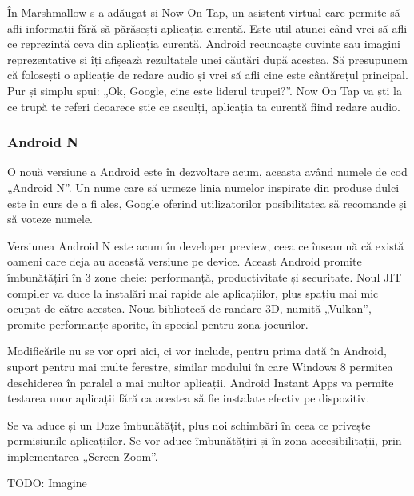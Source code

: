 \documentclass[12pt,a4paper]{article}
\begin{document}
	În Marshmallow s-a adăugat și Now On Tap, un asistent virtual care permite să afli informații fără să părăsești aplicația curentă. Este util atunci când vrei să afli ce reprezintă ceva din aplicația curentă. Android recunoaște cuvinte sau imagini reprezentative și îți afișează rezultatele unei căutări după acestea. Să presupunem că folosești o aplicație de redare audio și vrei să afli cine este cântărețul principal. Pur și simplu spui: „Ok, Google, cine este liderul trupei?”. Now On Tap va ști la ce trupă te referi deoarece știe ce asculți, aplicația ta curentă fiind redare audio.

\subsubsection{Android N}
O nouă versiune a Android este în dezvoltare acum, aceasta având numele de cod „Android N”. Un nume care să urmeze linia numelor inspirate din produse dulci este în curs de a fi ales, Google oferind utilizatorilor posibilitatea să recomande și să voteze numele.
	
	Versiunea Android N este acum în developer preview, ceea ce înseamnă că există oameni care deja au această versiune pe device. Aceast Android promite îmbunătățiri în 3 zone cheie: performanță, productivitate și securitate. Noul JIT compiler va duce la instalări mai rapide ale aplicațiilor, plus spațiu mai mic ocupat de către acestea. Noua bibliotecă de randare 3D, numită „Vulkan”, promite performanțe sporite, în special pentru zona jocurilor. 
	
	Modificările nu se vor opri aici, ci vor include, pentru prima dată în Android, suport pentru mai multe ferestre, similar modului în care Windows 8 permitea deschiderea în paralel a mai multor aplicații. Android Instant Apps va permite testarea unor aplicații fără ca acestea să fie instalate efectiv pe dispozitiv.	
	
	Se va aduce și un Doze îmbunătățit, plus noi schimbări în ceea ce privește permisiunile aplicațiilor. Se vor aduce îmbunătățiri și în zona accesibilitații, prin implementarea „Screen Zoom”.
	
	TODO: Imagine
\end{document}
